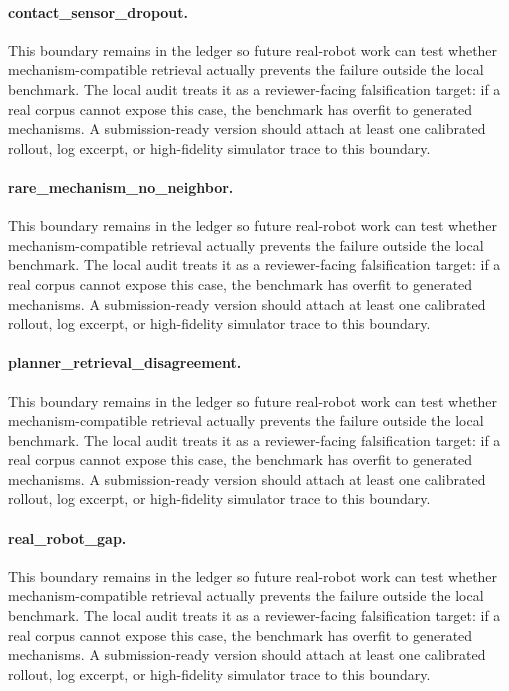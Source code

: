 \documentclass{article}
\begin{document}
\paragraph{contact\_sensor\_dropout.} This boundary remains in the ledger so future real-robot work can test whether mechanism-compatible retrieval actually prevents the failure outside the local benchmark. The local audit treats it as a reviewer-facing falsification target: if a real corpus cannot expose this case, the benchmark has overfit to generated mechanisms. A submission-ready version should attach at least one calibrated rollout, log excerpt, or high-fidelity simulator trace to this boundary.
\paragraph{rare\_mechanism\_no\_neighbor.} This boundary remains in the ledger so future real-robot work can test whether mechanism-compatible retrieval actually prevents the failure outside the local benchmark. The local audit treats it as a reviewer-facing falsification target: if a real corpus cannot expose this case, the benchmark has overfit to generated mechanisms. A submission-ready version should attach at least one calibrated rollout, log excerpt, or high-fidelity simulator trace to this boundary.
\paragraph{planner\_retrieval\_disagreement.} This boundary remains in the ledger so future real-robot work can test whether mechanism-compatible retrieval actually prevents the failure outside the local benchmark. The local audit treats it as a reviewer-facing falsification target: if a real corpus cannot expose this case, the benchmark has overfit to generated mechanisms. A submission-ready version should attach at least one calibrated rollout, log excerpt, or high-fidelity simulator trace to this boundary.
\paragraph{real\_robot\_gap.} This boundary remains in the ledger so future real-robot work can test whether mechanism-compatible retrieval actually prevents the failure outside the local benchmark. The local audit treats it as a reviewer-facing falsification target: if a real corpus cannot expose this case, the benchmark has overfit to generated mechanisms. A submission-ready version should attach at least one calibrated rollout, log excerpt, or high-fidelity simulator trace to this boundary.
\clearpage
\end{document}
